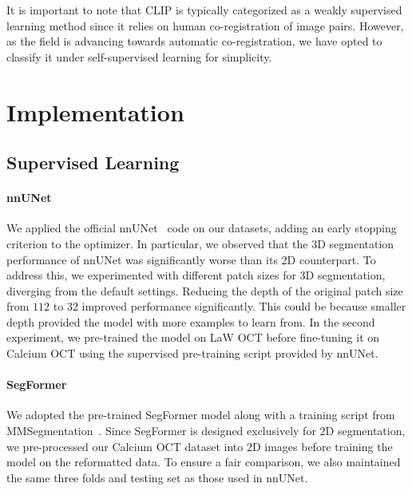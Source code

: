 \documentclass[a4paper,11pt,oneside]{report}
\begin{document}
It is important to note that CLIP is typically categorized as a weakly supervised learning method since it relies on human co-registration of image pairs. However, as the field is advancing towards automatic co-registration, we have opted to classify it under self-supervised learning for simplicity. 

\chapter{Implementation}


\section{Supervised Learning}
\subsubsection{nnUNet}
We applied the official nnUNet~\cite{Isensee2020} code on our datasets, adding an early stopping criterion to the optimizer. In particular, we observed that the 3D segmentation performance of nnUNet was significantly worse than its 2D counterpart. To address this, we experimented with different patch sizes for 3D segmentation, diverging from the default settings. Reducing the depth of the original patch size from $112$ to $32$ improved performance significantly. This could be because smaller depth provided the model with more examples to learn from. In the second experiment, we pre-trained the model on LaW OCT before fine-tuning it on Calcium OCT using the supervised pre-training script provided by nnUNet.

\subsubsection{SegFormer}\label{sec:implementation:segformer}
We adopted the pre-trained SegFormer model along with a training script from MMSegmentation~\cite{mmseg2020}. Since SegFormer is designed exclusively for 2D segmentation, we pre-processed our Calcium OCT dataset into 2D images before training the model on the reformatted data. To ensure a fair comparison, we also maintained the same three folds and testing set as those used in nnUNet.
\end{document}
